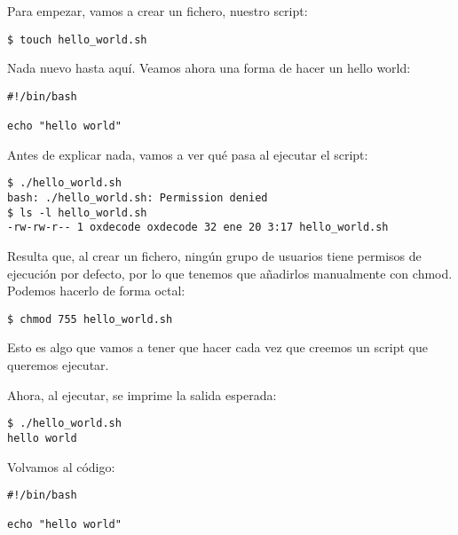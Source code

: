 Para empezar, vamos a crear un fichero, nuestro script:

\begin{tcolorbox-code}
\begin{lstlisting}
$ touch hello_world.sh
\end{lstlisting}
\end{tcolorbox-code}

Nada nuevo hasta aquí. Veamos ahora una forma de hacer un hello world:

\begin{tcolorbox-code}
\begin{lstlisting}
#!/bin/bash

echo "hello world"
\end{lstlisting}
\end{tcolorbox-code}

Antes de explicar nada, vamos a ver qué pasa al ejecutar el script:

\begin{tcolorbox-code}
\begin{lstlisting}
$ ./hello_world.sh
bash: ./hello_world.sh: Permission denied
$ ls -l hello_world.sh
-rw-rw-r-- 1 oxdecode oxdecode 32 ene 20 3:17 hello_world.sh
\end{lstlisting}
\end{tcolorbox-code}

Resulta que, al crear un fichero, ningún grupo de usuarios tiene permisos de ejecución por defecto, por lo que tenemos que añadirlos manualmente con chmod. Podemos hacerlo de forma octal:

\begin{tcolorbox-code}
\begin{lstlisting}
$ chmod 755 hello_world.sh
\end{lstlisting}
\end{tcolorbox-code}

Esto es algo que vamos a tener que hacer cada vez que creemos un script que queremos ejecutar.

Ahora, al ejecutar, se imprime la salida esperada:

\begin{tcolorbox-code}
\begin{lstlisting}
$ ./hello_world.sh
hello world
\end{lstlisting}
\end{tcolorbox-code}

Volvamos al código:

\begin{tcolorbox-code}
\begin{lstlisting}
#!/bin/bash

echo "hello world"
\end{lstlisting}
\end{tcolorbox-code}

